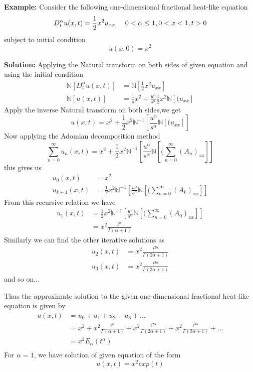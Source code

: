\textbf{Example:} Consider the following one-dimensional fractional heat-like equation
\begin{equation}
D_{t}^{\alpha}u(x,t)=\frac{1}{2}x^{2}u_{xx} \hspace{0.5cm}  0 < \alpha \leq 1,0 < x < 1,t> 0
\end{equation}
subject to initial condition
\begin{equation}
u(x,0)=x^{2}
\end{equation}


\textbf{Solution:}
Applying the Natural transform on both sides of given equation and using the initial condition
\begin{align*}
\mathbb{N}[D_{t}^{\alpha}u(x,t)]&=\mathbb{N}[\frac{1}{2}x^{2}u_{xx}]\\
\mathbb{N}[u(x,t)]&=\frac{1}{s}x^{2}+\frac{u^{\alpha}}{s^{\alpha}}\frac{1}{2}x^{2}\mathbb{N}[(u_{xx}]
\end{align*}
Apply the inverse Natural transform on both sides,we get
\begin{equation*}
u(x,t)=x^{2}+\frac{1}{2}x^{2}\mathbb{N}^{-1}[\frac{u^{\alpha}}{s^{\alpha}}\mathbb{N}[(u_{xx}]]
\end{equation*}
Now applying the Adomian decomposition method
\begin{equation}
\sum_{n=0}^{\infty}u_{n}(x,t)=x^{2}+\frac{1}{2}x^{2}\mathbb{N}^{-1}[\frac{u^{\alpha}}{s^{\alpha}}\mathbb{N}[(\sum_{n=0}^{\infty}(A_{n})_{xx}]]
\end{equation}
this gives us
\begin{align*}
u_{0}(x,t)&=x^{2}\\
u_{k+1}(x,t)&=\frac{1}{2}x^{2}\mathbb{N}^{-1}[\frac{u^{\alpha}}{s^{\alpha}}\mathbb{N}[(\sum_{n=0}^{\infty}(A_{k})_{xx}]]
\end{align*}
From this recursive relation we have 
\begin{align*}
u_{1}(x,t)&=\frac{1}{2}x^{2}\mathbb{N}^{-1}[\frac{u^{\alpha}}{s^{\alpha}}\mathbb{N}[(\sum_{n=0}^{\infty}(A_{0})_{xx}]]\\
&=x^{2}\frac{t^{\alpha}}{\Gamma(\alpha+1)}
\end{align*}
Similarly we can find the other iterative solutions as
\begin{align*}
u_{2}(x,t)&=x^{2}\frac{t^{2\alpha}}{\Gamma(2\alpha+1)}\\
u_{3}(x,t)&=x^{2}\frac{t^{3\alpha}}{\Gamma(3\alpha+1)}
\end{align*}
and so on...

Thus the approximate solution to the given one-dimensional fractional heat-like equation is given by
\begin{align*}
u(x,t)&=u_{0}+u_{1}+u_{2}+u_{3}+...\\
&=x^{2}+x^{2}\frac{t^{\alpha}}{\Gamma(\alpha+1)}+x^{2}\frac{t^{2\alpha}}{\Gamma(2\alpha+1)}+x^{2}\frac{t^{3\alpha}}{\Gamma(3\alpha+1)}+...\\
&=x^{2}E_{\alpha}(t^{\alpha})\\
\end{align*}
For $ \alpha=1 $, we have solution of given equation of the form
\begin{equation}
u(x,t)=x^{2}exp(t)
\end{equation}

